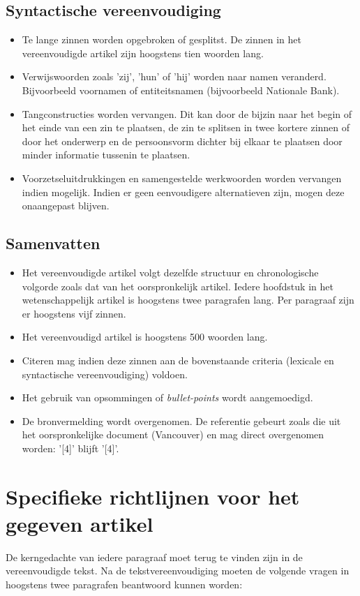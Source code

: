 \documentclass{report}
\begin{document}
	\section{Syntactische vereenvoudiging}
	
	\begin{itemize}
		\item Te lange zinnen worden opgebroken of gesplitst. De zinnen in het vereenvoudigde artikel zijn hoogstens tien woorden lang.
		\item Verwijswoorden zoals 'zij', 'hun' of 'hij' worden naar namen veranderd. Bijvoorbeeld voornamen of entiteitsnamen (bijvoorbeeld Nationale Bank). 
		\item Tangconstructies worden vervangen. Dit kan door de bijzin naar het begin of het einde van een zin te plaatsen, de zin te splitsen in twee kortere zinnen of door het onderwerp en de persoonsvorm dichter bij elkaar te plaatsen door minder informatie tussenin te plaatsen.
		\item Voorzetseluitdrukkingen en samengestelde werkwoorden worden vervangen indien mogelijk. Indien er geen eenvoudigere alternatieven zijn, mogen deze onaangepast blijven.
	\end{itemize}
	
	\section{Samenvatten}
	
	\begin{itemize}
		\item Het vereenvoudigde artikel volgt dezelfde structuur en chronologische volgorde zoals dat van het oorspronkelijk artikel. Iedere hoofdstuk in het wetenschappelijk artikel is hoogstens twee paragrafen lang. Per paragraaf zijn er hoogstens vijf zinnen.
		\item Het vereenvoudigd artikel is hoogstens 500 woorden lang. 
		\item Citeren mag indien deze zinnen aan de bovenstaande criteria (lexicale en syntactische vereenvoudiging) voldoen.
		\item Het gebruik van opsommingen of \textit{bullet-points} wordt aangemoedigd.
		\item De bronvermelding wordt overgenomen. De referentie gebeurt zoals die uit het oorspronkelijke document (Vancouver) en mag direct overgenomen worden: '[4]' blijft '[4]'.
	\end{itemize}
	
	
	\chapter{Specifieke richtlijnen voor het gegeven artikel}
De kerngedachte van iedere paragraaf moet terug te vinden zijn in de vereenvoudigde tekst. Na de tekstvereenvoudiging moeten de volgende vragen in hoogstens twee paragrafen beantwoord kunnen worden:
	
\end{document}

